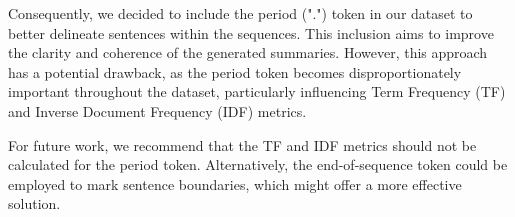 \documentclass[a4paper, 11pt]{article}
\begin{document}
Consequently, we decided to include the period (".") token in our dataset to better delineate sentences within the sequences. This inclusion aims to improve the clarity and coherence of the generated summaries. However, this approach has a potential drawback, as the period token becomes disproportionately important throughout the dataset, particularly influencing Term Frequency (TF) and Inverse Document Frequency (IDF) metrics.

For future work, we recommend that the TF and IDF metrics should not be calculated for the period token. Alternatively, the end-of-sequence token could be employed to mark sentence boundaries, which might offer a more effective solution.

\clearpage{}


\end{document}
